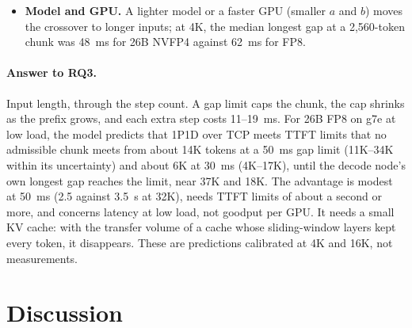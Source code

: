 \documentclass[11pt]{article}
\begin{document}
\begin{itemize}
  \item \textbf{Model and GPU.} A lighter model or a faster GPU (smaller $a$ and $b$) moves the crossover to longer inputs; at 4K, the median longest gap at a 2,560-token chunk was 48~ms for 26B NVFP4 against 62~ms for FP8.
\end{itemize}

\paragraph{Answer to RQ3.} Input length, through the step count. A gap limit caps the chunk, the cap shrinks as the prefix grows, and each extra step costs 11--19~ms. For 26B FP8 on g7e at low load, the model predicts that 1P1D over TCP meets TTFT limits that no admissible chunk meets from about 14K tokens at a 50~ms gap limit (11K--34K within its uncertainty) and about 6K at 30~ms (4K--17K), until the decode node's own longest gap reaches the limit, near 37K and 18K. The advantage is modest at 50~ms (2.5 against 3.5~s at 32K), needs TTFT limits of about a second or more, and concerns latency at low load, not goodput per GPU. It needs a small KV cache: with the transfer volume of a cache whose sliding-window layers kept every token, it disappears. These are predictions calibrated at 4K and 16K, not measurements.

\section{Discussion}
\end{document}

